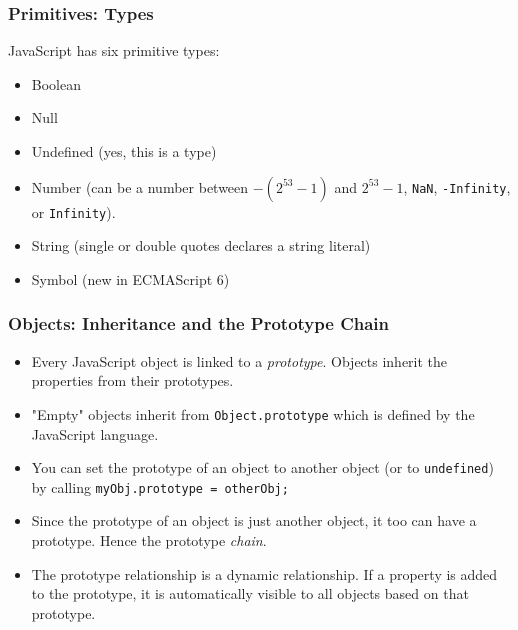 \documentclass{lug}
\begin{document}
\begin{frame}
    \frametitle{Primitives: Types\footnotemark[1]}

    JavaScript has six primitive types:

    \begin{itemize}
        \item Boolean
        \item Null
        \item Undefined (yes, this is a type)
        \item Number (can be a number between $-(2^{53} - 1)$ and $2^{53} - 1$, \texttt{NaN},
            \texttt{-Infinity}, or \texttt{Infinity}).
        \item String (single or double quotes declares a string literal\footnotemark[2])
        \item Symbol (new in ECMAScript 6)
    \end{itemize}

\end{frame}

\begin{frame}
    \frametitle{Objects: Inheritance and the Prototype Chain}

    \begin{itemize}[<+->]
        \item Every JavaScript object is linked to a \textit{prototype}. Objects inherit the
            properties from their prototypes.

        \item "Empty" objects inherit from \texttt{Object.prototype} which is defined by the
            JavaScript language.

        \item You can set the prototype of an object to another object (or to \texttt{undefined}) by calling
            \texttt{myObj.prototype = otherObj;}

        \item Since the prototype of an object is just another object, it too can have a
            prototype. Hence the prototype \textit{chain}.

        \item The prototype relationship is a dynamic relationship. If a property is added to the
            prototype, it is automatically visible to all objects based on that prototype.
    \end{itemize}

\end{frame}
\end{document}
